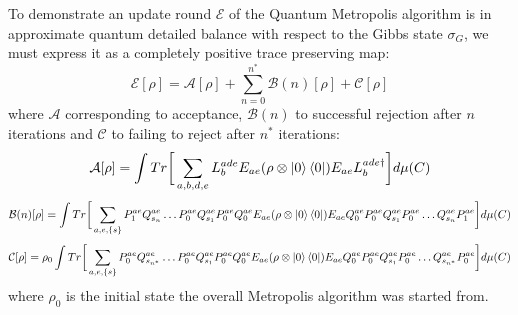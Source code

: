 \documentclass[aps,floatfix,10pt,amssymb,amsfont,amsmath,superscriptaddress,float,nofootinbib,longbibliography,nobalancelastpage,twocolumn]{revtex4-2}
\begin{document}
\begin{widetext}
To demonstrate an update round $\mathcal{E}$ of the Quantum Metropolis algorithm is in approximate quantum detailed balance with respect to the Gibbs state $\sigma_G$, we must express it as a completely positive trace preserving map:
\begin{equation}
    \mathcal{E}[\rho] = \mathcal{A}[\rho] + \sum_{n=0}^{n^*} \mathcal{B}(n)[\rho] + \mathcal{C}[\rho]
\end{equation}
where $\mathcal{A}$ corresponding to acceptance, $\mathcal{B}(n)$ to successful rejection after $n$ iterations and $\mathcal{C}$ to failing to reject after $n^*$ iterations:
\begin{equation}
    \mathcal{A}[\rho] = \int  Tr\bigg[\sum_{a,b,d,e}L_b^{ade} E_{ae} ( \rho\otimes \ket{0}\bra{0}) 
     E_{ae}L^{ade\dagger}_b\bigg]d\mu(C)
\end{equation}
\begin{equation}
    \mathcal{B}(n)[\rho] = \int Tr\bigg[\sum_{a,e,\{s\}}P^{ae}_1Q^{ae}_{s_n}\ldots P^{ae}_0Q^{ae}_{s_1}P^{ae}_0Q^{ae}_0E_{ae} ( \rho\otimes \ket{0}\bra{0})E_{ae}Q^{ae}_0P^{ae}_0Q^{ae}_{s_1}P^{ae}_0\ldots Q^{ae}_{s_n}P^{ae}_1\bigg]d\mu(C)
\end{equation}
\begin{equation}
    \mathcal{C}[\rho] = \rho_0 \int Tr\bigg[\sum_{a,e,\{s\}}P^{ae}_0Q^{ae}_{s_{n^*}}\ldots P^{ae}_0Q^{ae}_{s_1}P^{ae}_0Q^{ae}_0E_{ae} ( \rho\otimes \ket{0}\bra{0})E_{ae}Q^{ae}_0P^{ae}_0Q^{ae}_{s_1}P^{ae}_0\ldots Q^{ae}_{s_{n^*}}P^{ae}_0\bigg]d\mu(C) 
\end{equation}
where $\rho_0$ is the initial state the overall Metropolis algorithm was started from. 



\end{widetext}
\end{document}
